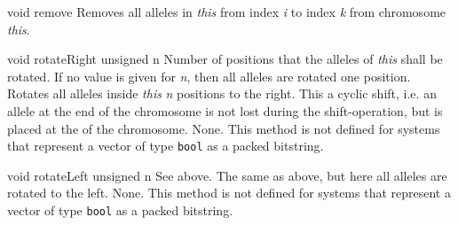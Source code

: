 \vspace*{4ex}

    \setCorrectWidthThree{8pt}
    \printMethodWithParamsSaved
        {void}
        {}
        {remove}
        {Removes all alleles in {\em this} from index {\em i} to index {\em k}
         from chromosome {\em this}.}
        {}
    \setCorrectWidthThree{4pt}

\clearpage

    \printMethodWithOneParam
    {void} 
    {rotateRight}
    {unsigned} 
    {n} 
    {Number of positions that the alleles of {\em this} shall be rotated.
     If no value is given for {\em n}, then all alleles are rotated 
     one position.}
    {Rotates all alleles inside {\em this} {\em n} positions to the right.
     This a cyclic shift, i.e. an allele at the end of the chromosome
     is not lost during the shift-operation, but is placed at the
     of the chromosome.}
    {None.}
    {This method is not defined for systems that represent a vector of
     type {\tt bool} as a packed bitstring.}

\vspace*{4ex}

    \printMethodWithOneParam
    {void} 
    {rotateLeft}
    {unsigned} 
    {n} 
    {See above.}
    {The same as above, but here all alleles are rotated to the left.}
    {None.}
    {This method is not defined for systems that represent a vector of
     type {\tt bool} as a packed bitstring.}



